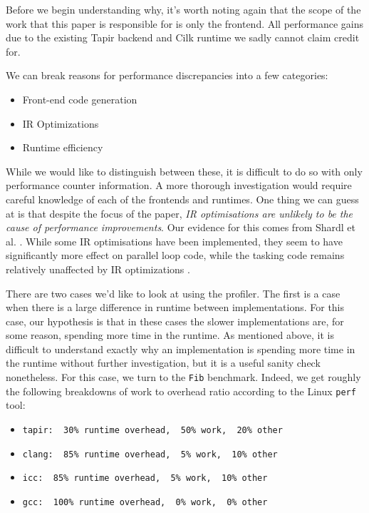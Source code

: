 \documentclass[sigconf]{acmart}
\begin{document}
Before we begin understanding why, it's worth noting again that the scope of the 
work that this paper is responsible for is only the frontend. All performance
gains due to the existing Tapir backend and Cilk runtime we sadly cannot claim
credit for. 

We can break reasons for performance discrepancies into a few categories: 

\begin{itemize}
\item Front-end code generation
\item IR Optimizations
\item Runtime efficiency
\end{itemize}

While we would like to distinguish between these, it is difficult to do so with
only performance counter information. A more thorough investigation would
require careful knowledge of each of the frontends and runtimes. One thing we
can guess at is that despite the focus of the paper, \emph{IR optimisations are
unlikely to be the cause of performance improvements}. Our evidence for this
comes from Shardl et al. \cite{}. While some IR optimisations have been
implemented, they seem to have significantly more effect on parallel loop code,
while the tasking code remains relatively unaffected by IR optimizations
\cite{}. 

There are two cases we'd like to look at using the profiler. The first is a 
case when there is a large difference in runtime between implementations. For 
this case, our hypothesis is that in these cases the slower implementations
are, for some reason, spending more time in the runtime. As mentioned above, 
it is difficult to understand exactly why an implementation is spending more 
time in the runtime without further investigation, but it is a useful 
sanity check nonetheless. For this case, we turn to the \texttt{Fib} benchmark.
Indeed, we get roughly the following breakdowns of work to overhead ratio according
to the Linux \texttt{perf} tool:

\begin{itemize}
\item \texttt{tapir: ~30\% runtime overhead, ~50\% work, ~20\% other}
\item \texttt{clang: ~85\% runtime overhead, ~5\% work, ~10\% other}
\item \texttt{icc: ~85\% runtime overhead, ~5\% work, ~10\% other}
\item \texttt{gcc: ~100\% runtime overhead, ~0\% work, ~0\% other}
\end{itemize}
\end{document}
